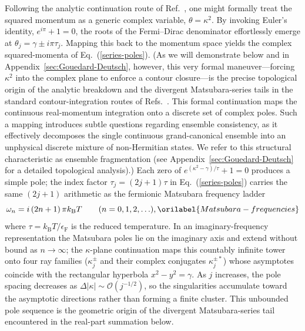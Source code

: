 \documentclass[aps,showkeys,noshowpacs,superscriptaddress,pre,preprint]{revtex4-2}
\let\label\orilabel
\begin{document}
Following the analytic continuation route of Ref.~\cite{Khanna-Glyde1976}, one might formally treat the squared momentum as a generic complex variable, $\theta = \kappa^2$. By invoking Euler's identity, $e^{i\pi} + 1 = 0$, the roots of the Fermi--Dirac denominator effortlessly emerge at $\theta_j = \gamma \pm i\pi\tau_j$. Mapping this back to the momentum space yields the complex squared-momenta of Eq.~(\ref{series-poles}). (As we will demonstrate below and in Appendix~\ref{sec:Gouedard-Deutsch}, however, this very formal maneuver---forcing $\kappa^2$ into the complex plane to enforce a contour closure---is the precise topological origin of the analytic breakdown and the divergent Matsubara-series tails in the standard contour-integration routes of Refs.~\cite{Khanna-Glyde1976,Gouedard-Deutsch1978}. This formal continuation maps the continuous real-momentum integration onto a discrete set of complex poles. Such a mapping introduces subtle questions regarding ensemble consistency, as it effectively decomposes the single continuous grand-canonical ensemble into an unphysical discrete mixture of non-Hermitian states. We refer to this structural characteristic as ensemble fragmentation (see Appendix~\ref{sec:Gouedard-Deutsch} for a detailed topological analysis).)
Each zero of $e^{\left( \kappa^2 - \gamma \right) / \tau} + 1 = 0$ produces a simple pole;
the index factor $\tau_j = \left( 2j + 1 \right) \tau$ in Eq.~(\ref{series-poles})
carries the same $(2j+1)$ arithmetic as the fermionic Matsubara frequency ladder
\begin{equation}
\omega_n = i \left( 2n + 1 \right) \pi k_\mathrm{B} T \qquad (n = 0, 1, 2, \ldots),
\label{Matsubara-frequencies}
\end{equation}
where $\tau = k_\mathrm{B} T / \epsilon_\mathrm{F}$ is the reduced temperature.
In an imaginary-frequency representation the Matsubara poles lie on the imaginary axis
and extend without bound as $n \to \infty$;
the $\kappa$-plane continuation maps this countably infinite tower onto four ray families
(${\kappa_j^\pm}$ and their complex conjugates ${\kappa_j^{\pm\ast}}$)
whose asymptotes coincide with the rectangular hyperbola $x^2 - y^2 = \gamma$.
As $j$ increases, the pole spacing decreases as $\Delta |\kappa| \sim \mathcal{O}\!\left(j^{-1/2}\right)$,
so the singularities accumulate toward the asymptotic directions rather than forming a finite cluster.
This unbounded pole sequence is the geometric origin of the divergent Matsubara-series tail
encountered in the real-part summation below.
\end{document}
